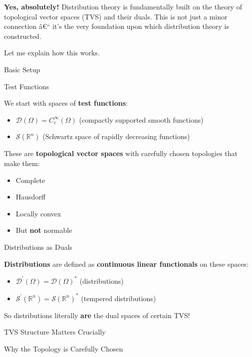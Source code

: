\documentclass[aps,preprint]{revtex4}
\newenvironment{answer}
  {\begin{tcolorbox}[colback=green!5!white,colframe=green!75!black,title=Answer]}
  {\end{tcolorbox}}
\begin{document}
\begin{answer}
\textbf{Yes, absolutely!} Distribution theory is fundamentally built on the
theory of topological vector spaces (TVS) and their duals. This is not just
a minor connection \^{a}\euro `` it's the very foundation upon which
distribution theory is constructed.

Let me explain how this works.

Basic Setup

Test Functions

We start with spaces of \textbf{test functions}:

\begin{itemize}
\item $\mathcal{D}(\Omega) = C_c^\infty(\Omega)$ (compactly supported smooth
functions)

\item $\mathcal{S}(\mathbb{R}^n)$ (Schwartz space of rapidly decreasing
functions)
\end{itemize}

These are \textbf{topological vector spaces} with carefully chosen
topologies that make them:

\begin{itemize}
\item Complete

\item Hausdorff

\item Locally convex

\item But \textbf{not} normable
\end{itemize}

Distributions as Duals

\textbf{Distributions} are defined as \textbf{continuous linear functionals}
on these spaces:

\begin{itemize}
\item $\mathcal{D}^{\prime }(\Omega) = \mathcal{D}(\Omega)^*$ (distributions)

\item $\mathcal{S}^{\prime }(\mathbb{R}^n) = \mathcal{S}(\mathbb{R}^n)^*$
(tempered distributions)
\end{itemize}

So distributions literally \textbf{are} the dual spaces of certain TVS!

TVS Structure Matters Crucially

Why the Topology is Carefully Chosen


\end{answer}
\end{document}
